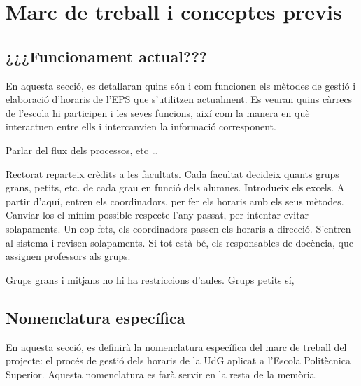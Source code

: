 \documentclass[a4paper,12pt]{ThesisStyle}
\begin{document}
\chapter{Marc de treball i conceptes previs}
\label{cap:marcdetreball}

\section{¿¿¿Funcionament actual???}
\label{sec:funcionament_actual}

En aquesta secció, es detallaran quins són i com funcionen els mètodes de gestió i elaboració d'horaris de l'EPS que s'utilitzen actualment. Es veuran quins càrrecs de l'escola hi participen i les seves funcions, així com la manera en què interactuen entre ells i intercanvien la informació corresponent.

Parlar del flux dels processos, etc \ldots

Rectorat reparteix crèdits a les facultats. Cada facultat decideix quants grups grans, petits, etc. de cada grau en funció dels alumnes. Introdueix els excels.
A partir d'aquí, entren els coordinadors, per fer els horaris amb els seus mètodes. Canviar-los el mínim possible respecte l'any passat, per intentar evitar
solapaments. Un cop fets, els coordinadors passen els horaris a direcció. S'entren al sistema i revisen solapaments. Si tot està bé, els responsables de docència,
que assignen professors als grups.

Grups grans i mitjans no hi ha restriccions d'aules. Grups petits sí,

\section{Nomenclatura específica}
\label{sec:nomenclatura}

En aquesta secció, es definirà la nomenclatura específica del marc de treball del projecte: el procés de gestió dels horaris de la UdG aplicat a l'Escola Politècnica Superior. Aquesta nomenclatura es farà servir en la resta de la memòria.
\end{document}
